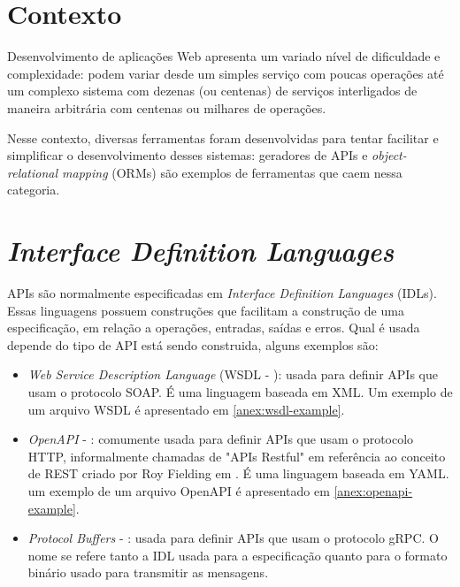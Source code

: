 \section{Contexto}

Desenvolvimento de aplicações Web apresenta um variado nível de dificuldade e
complexidade: podem variar desde um simples serviço com poucas operações até
um complexo sistema com dezenas (ou centenas) de serviços interligados de maneira
arbitrária com centenas ou milhares de operações.


Nesse contexto, diversas ferramentas foram desenvolvidas para tentar facilitar
e simplificar o desenvolvimento desses sistemas: geradores de APIs e \textit{object-relational
mapping} (ORMs) são exemplos de ferramentas que caem nessa categoria.

\section{\textit{Interface Definition Languages}}

APIs são normalmente especificadas em \textit{Interface Definition Languages}
(IDLs). Essas linguagens possuem construções que facilitam a construção de uma
especificação, em relação a operações, entradas, saídas e erros. Qual é usada
depende do tipo de API está sendo construida, alguns exemplos são:

\begin{itemize}
\item
  \textit{Web Service Description Language} (WSDL - \cite{wsdl:spec}): usada para
    definir APIs que usam o protocolo SOAP. É uma linguagem baseada em XML.
    Um exemplo de um arquivo WSDL é apresentado em \ref{anex:wsdl-example}.
\item
  \textit{OpenAPI} - \cite{openapi:spec}: comumente usada para definir APIs que usam
    o protocolo HTTP, informalmente chamadas de "APIs Restful" em referência ao conceito
    de REST criado por Roy Fielding em \cite{10.5555/932295}. É uma linguagem baseada
    em YAML. um exemplo de um arquivo OpenAPI é apresentado em \ref{anex:openapi-example}.
\item
  \textit{Protocol Buffers} - \cite{googl:protobuf}: usada para definir APIs que usam
    o protocolo gRPC. O nome se refere tanto a IDL usada para a especificação quanto
    para o formato binário usado para transmitir as mensagens.
\end{itemize}

